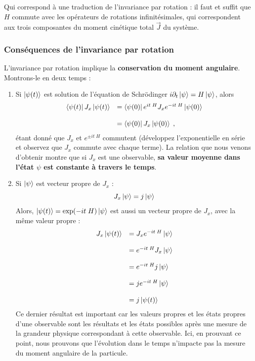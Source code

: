 \documentclass[../notesdecours.tex]{subfiles}
\begin{document}
Qui correspond à une traduction de l'invariance par rotation : il faut et suffit que $H$ commute avec les opérateurs de rotations infinitésimales, qui correspondent aux trois composantes du moment cinétique total $\vec J$ du système.

\subsubsection{Conséquences de l'invariance par rotation}
L'invariance par rotation implique la \textbf{conservation du moment angulaire}. Montrons-le en deux temps :
\begin{enumerate}
    \item Si $\ket{\psi(t)}$ est solution de l'équation de Schrödinger $i\partial_t \ket\psi = H\ket\psi$, alors 
    $$\begin{array}{ll}
        \bra{\psi(t)}J_x\ket{\psi(t)} &= \bra{\psi(0)} e^{it\; H} J_x e^{-it\; H}\ket{\psi(0)} \\
        \strut \\
        &= \bra{\psi(0)}J_x\ket{\psi(0)} \; ,
    \end{array}$$ 
    étant donné que $J_x$ et $e^{\pm it\; H}$ commutent (développez l'exponentielle en série et observez que $J_x$ commute avec chaque terme). La relation que nous venons d'obtenir montre que si $J_x$ est une observable, \textbf{sa valeur moyenne dans l'état $\psi$ est constante à travers le temps}.

    \item Si $\ket \psi$ est vecteur propre de $J_x$ :
    $$J_x\ket \psi = j \ket \psi$$
    Alors, $\ket{\psi(t)} = \exp(-it\; H)\ket\psi$ est aussi un vecteur propre de $J_x$, avec la même valeur propre :
    $$
    \begin{array}{ll}
        J_x \ket{\psi(t)} &= J_x e^{-it\; H}\ket\psi\\
        \strut \\
        &= e^{-it\; H}J_x \ket \psi \\
        \strut \\
        &= e^{-it\; H} j\ket \psi \\
        \strut \\
        &= j e^{-it\; H}\ket\psi \\
        \strut \\
        &= j \ket{\psi(t)}
    \end{array}
    $$
    Ce dernier résultat est important car les valeurs propres et les états propres d'une observable sont les résultats et les états possibles après une mesure de la grandeur physique correspondant à cette observable. Ici, en prouvant ce point, nous prouvons que l'évolution dans le temps n'impacte pas la mesure du moment angulaire de la particule.
\end{enumerate}
\end{document}
